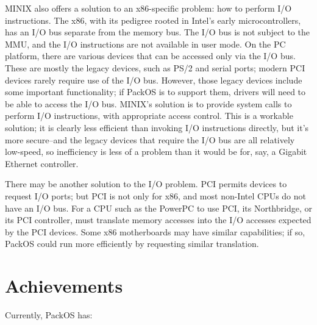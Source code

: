 \documentclass{article}
\begin{document}
MINIX also offers a solution to an x86-specific problem: how to
perform I/O instructions.  The x86, with its pedigree rooted
in Intel's early
microcontrollers, has an I/O bus separate from the memory bus.  
The
I/O bus is not subject to the MMU, and
the I/O instructions are not available in user mode.
On the
PC platform, there are various devices that can be accessed only via
the I/O bus.  These are mostly the legacy devices, such as PS/2 and
serial ports; modern PCI devices rarely require use of the I/O bus.
However, those legacy devices include some important functionality;
if PackOS is to support them, drivers will need
to be able to access the I/O bus.  MINIX's solution is to provide
system calls to perform I/O instructions, with appropriate
access control.  This is a workable solution; it is clearly less
efficient than invoking I/O instructions directly,
but it's more secure--and the legacy devices that require the I/O bus
are all relatively low-speed, so inefficiency is less of a problem
than it would be for, say, a Gigabit Ethernet controller.

There may be another solution to the I/O problem.  PCI permits devices
to request I/O ports; but PCI is not only for x86, and most non-Intel
CPUs do not have an I/O bus.  For a CPU such as the PowerPC to use
PCI, its Northbridge, or its PCI controller, must translate
memory accesses into the I/O accesses expected by the PCI devices.
Some x86 motherboards may have similar capabilities; if so, PackOS
could run more efficiently by requesting similar translation.

\section{Achievements}

Currently, PackOS has:
\end{document}
